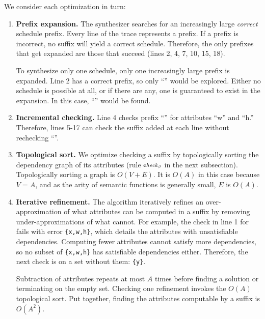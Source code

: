 We consider each optimization in turn:

\begin{enumerate}

\item \textbf{Prefix expansion.} The synthesizer searches for an increasingly large \emph{correct} schedule prefix. Every line of the trace represents a prefix. If a prefix is incorrect, no suffix will yield a correct schedule. Therefore, the only prefixes that get expanded are those that succeed (lines 2, 4, 7, 10, 15, 18). 

To synthesize only one schedule, only one increasingly large prefix is expanded. Line 2 has a correct prefix, so only ``'' would be explored. Either no schedule is possible at all, or if there are any, one is guaranteed to exist in the expansion. In this case,  ``'' would be found.


\item \textbf{Incremental checking.} Line 4  checks prefix ``'' for attributes ``w'' and ``h.'' Therefore, lines 5-17 can check the suffix added at each line without rechecking  ``''. 

\item \textbf{Topological sort.} We optimize checking a suffix by topologically sorting the dependency graph of its attributes  (rule ${\scriptstyle\textbf check_\beta}$ in the next subsection). Topologically sorting a graph is $O(V + E)$.  It is $O(A)$ in this case because $V = A$, and as the arity of semantic functions is generally small, $E$ is $O(A)$.  

\item \textbf{Iterative refinement.} The algorithm iteratively refines an over-approximation of what attributes can be computed in a suffix by removing under-approximations of what cannot. For example, the check in line 1 for  fails with error \lstinline|{x,w,h}|, which details the attributes with unsatisfiable dependencies. Computing fewer attributes cannot satisfy more dependencies, so no  subset of \lstinline|{x,w,h}| has satisfiable dependencies either. Therefore, the next check is on a set without them: \lstinline|{y}|. 

Subtraction of attributes repeats at most $A$ times before finding a solution or terminating on the empty set. Checking one refinement invokes the $O(A)$ topological sort. Put together, finding the attributes computable by a suffix is $O(A^2)$.
\end{enumerate}

